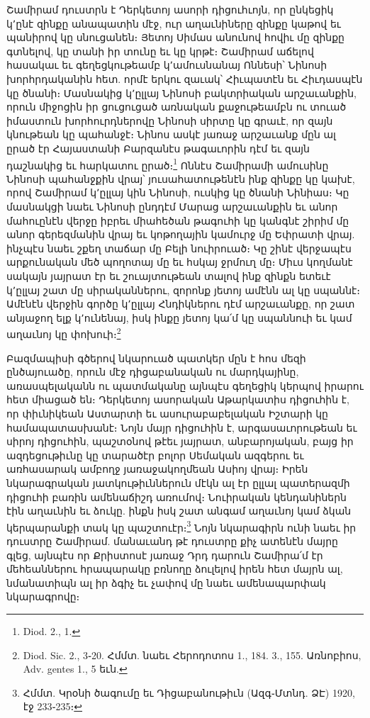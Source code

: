 \documentclass{article}
\begin{document}
{Շամիրամ դուստրն է Դերկետոյ ասորի դիցուհւոյն, որ ընկեցիկ կ՚ընէ զինքը անապատին մէջ, ուր աղաւնիները զինքը կաթով եւ պանիրով կը սնուցանեն։ Յետոյ Սիմաս անունով հովիւ մը զինքը գտնելով, կը տանի իր տունը եւ կը կրթէ։ Շամիրամ աճելով հասակաւ եւ գեղեցկութեամբ կ՚ամուսնանայ Ոննեսի՝ Նինոսի խորհրդականին հետ. որմէ երկու զաւակ՝ Հիւպատէն եւ Հիւդասպէն կը ծնանի։ Մասնակից կ՚ըլլայ Նինոսի բակտրիական արշաւանքին, որուն միջոցին իր ցուցուցած առնական քաջութեամբն ու տուած իմաստուն խորհուրդներովը Նինոսի սիրտը կը գրաւէ, որ զայն կնութեան կը պահանջէ։ Նինոս ասկէ յառաջ արշաւանք մըն ալ ըրած էր Հայաստանի Բարզանէս թագաւորին դէմ եւ զայն դաշնակից եւ հարկատու ըրած։\footnote{Diod. 2., 1.} Ոննէս Շամիրամի ամուսինը Նինոսի պահանջքին վրայ՝ յուսահատութենէն ինք զինքը կը կախէ, որով Շամիրամ կ՚ըլլայ կին Նինոսի, ուսկից կը ծնանի Նինիաս։ Կը մասնակցի նաեւ Նինոսի ընդդէմ Մարաց արշաւանքին եւ անոր մահուընէն վերջը իբրեւ միահեծան թագուհի կը կանգնէ շիրիմ մը անոր գերեզմանին վրայ եւ կոթողային կամուրջ մը Եփրատի վրայ. ինչպէս նաեւ շքեղ տաճար մը Բելի նուիրուած։ Կը շինէ վերջապէս արքունական մեծ պողոտայ մը եւ հսկայ ջրմուղ մը։ Միւս կողմանէ սակայն յայրատ էր եւ շուայտութեան տալով ինք զինքն ետեւէ կ՚ըլլայ շատ մը սիրականներու, զորոնք յետոյ ամէնն ալ կը սպաննէ։ Ամէնէն վերջին գործը կ՚ըլլայ Հնդիկներու դէմ արշաւանքը, որ շատ անյաջող ելք կ՚ունենայ, իսկ ինքը յետոյ կա՛մ կը սպաննուի եւ կամ աղաւնոյ կը փոխուի։\footnote{Diod. Sic. 2., 3֊20. Հմմտ. նաեւ Հերոդոտոս 1., 184. 3., 155. Առնոբիոս, Adv. gentes 1., 5 եւն.}

Բազմապիսի գծերով նկարուած պատկեր մըն է հոս մեզի ընծայուածը, որուն մէջ դիցաբանական ու մարդկայինը, առասպելականն ու պատմականը այնպէս գեղեցիկ կերպով իրարու հետ միացած են։ Դերկետոյ ասորական Աթարկատիս դիցուհին է, որ փիւնիկեան Աստարտի եւ ասուրաբաբելական Իշտարի կը համապատասխանէ։ Նոյն մայր դիցուհին է, արգասաւորութեան եւ սիրոյ դիցուհին, պաշտօնով թէեւ յայրատ, անբարոյական, բայց իր ազդեցութիւնը կը տարածէր բոլոր Սեմական ազգերու եւ առհասարակ ամբողջ յառաջակողմեան Ասիոյ վրայ։ Իրեն նկարագրական յատկութիւններուն մէկն ալ էր ըլլալ պատերազմի դիցուհի բառին ամենաճիշդ առումով։ Նուիրական կենդանիներն էին աղաւնին եւ ձուկը. ինքն իսկ շատ անգամ աղաւնոյ կամ ձկան կերպարանքի տակ կը պաշտուէր։\footnote{Հմմտ. Կրօնի ծագումը եւ Դիցաբանութիւն (Ազգ֊Մտնդ. ՁԷ) 1920, էջ 233֊235։} Նոյն նկարագիրն ունի նաեւ իր դուստրը Շամիրամ. մանաւանդ թէ դուստրը քիչ ատենէն մայրը գլեց, այնպէս որ Քրիստոսէ յառաջ Դրդ դարուն Շամիրա՛մ էր մեհեաններու հրապարակը բռնողը ձուլելով իրեն հետ մայրն ալ, նմանատիպն ալ իր ձգիչ եւ չափով մը նաեւ ամենապարփակ նկարագրովը։

}
\end{document}
